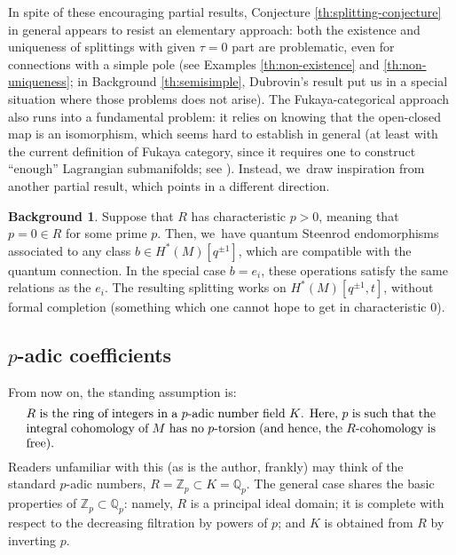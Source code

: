 \documentclass[JEP,XML,SOM,Unicode,NoFloatCountersInSection,published]{cedram}
\theoremstyle{plain}
\theoremstyle{definition}
\newtheorem{background}[theorem]{Background}
\newcommand{\bQ}{{\mathbb Q}}
\newcommand{\bZ}{{\mathbb Z}}
\begin{document}
In spite of these encouraging partial results, Conjecture \ref{th:splitting-conjecture} in general appears to resist an elementary approach: both the existence and uniqueness of splittings with given $\tau = 0$ part are problematic, even for connections with a simple pole (see Examples \ref{th:non-existence} and \ref{th:non-uniqueness}; in Background \ref{th:semisimple}, Dubrovin's result put us in a special situation where those problems does not arise). The Fukaya-categorical approach also runs into a fundamental problem: it relies on knowing that the open-closed map is an isomorphism, which seems hard to establish in general (at least with the current definition of Fukaya category, since it requires one to construct ``enough'' Lagrangian submanifolds; see \cite{ganatra16}). Instead, we~draw inspiration from another partial result, which points in a different direction.

\begin{background} \label{th:characteristic-p}
Suppose that $R$ has characteristic $p>0$, meaning that $p = 0 \in R$ for some prime $p$. Then, we~have quantum Steenrod endomorphisms \cite{fukaya93b, wilkins18, seidel23, seidel-wilkins21} associated to any class $b \in H^*(M)[q^{\pm 1}]$, which are compatible with the quantum connection. In the special case $b = e_i$, these operations satisfy the same relations as the $e_i$. The resulting splitting works on $H^*(M)[q^{\pm 1},t]$, without formal completion (something which one cannot hope to get in characteristic $0$).
\end{background}

\subsection{$p$-adic coefficients}
From now on, the standing assumption is:
\begin{equation} \label{eq:p-adic-number-ring}
\parbox{33em}{$R$ is the ring of integers in a $p$-adic number field $K$. Here, $p$ is such that the integral cohomology of $M$ has no $p$-torsion (and hence, the $R$-cohomology is free).}
\end{equation}
Readers unfamiliar with this (as is the author, frankly) may think of the standard $p$-adic numbers, $R = \bZ_p \subset K = \bQ_p$. The general case shares the basic properties of $\bZ_p \subset \bQ_p$: namely, $R$ is a principal ideal domain; it is complete with respect to the decreasing filtration by powers of $p$; and $K$ is obtained from $R$ by inverting $p$.
\end{document}
